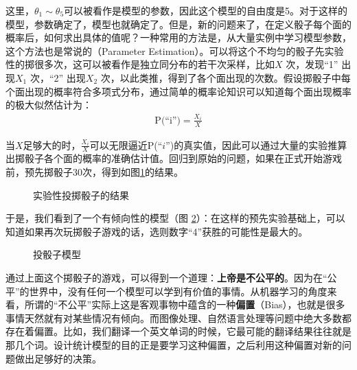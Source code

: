 \noindent 这里，$\theta_1 \sim \theta_5$可以被看作是模型的参数，因此这个模型的自由度是5。对于这样的模型，参数确定了，模型也就确定了。但是，新的问题来了，在定义骰子每个面的概率后，如何求出具体的值呢？一种常用的方法是，从大量实例中学习模型参数，这个方法也是常说的{\small{}}（Parameter Estimation）。可以将这个不均匀的骰子先实验性的掷很多次，这可以被看作是独立同分布的若干次采样，比如$X$ 次，发现``1'' 出现$X_1$ 次，``2'' 出现$X_2$ 次，以此类推，得到了各个面出现的次数。假设掷骰子中每个面出现的概率符合多项式分布，通过简单的概率论知识可以知道每个面出现概率的极大似然估计为：
\begin{eqnarray}
\textrm{P(``i'')}=\frac {X_i}{X}
\label{eq:2-19}
\end{eqnarray}

\parinterval 当$X$足够大的时，$\frac{X_i}{X}$可以无限逼近P(``$i$'')的真实值，因此可以通过大量的实验推算出掷骰子各个面的概率的准确估计值。回归到原始的问题，如果在正式开始游戏前，预先掷骰子30次，得到如图\ref{fig:2-12}的结果。

\begin{figure}[htp]
\centering

\caption{实验性投掷骰子的结果}
\label{fig:2-12}
\end{figure}

\parinterval 于是，我们看到了一个有倾向性的模型（图 \ref{fig:2-13}）：在这样的预先实验基础上，可以知道如果再次玩掷骰子游戏的话，选则数字``4''获胜的可能性是最大的。

\begin{figure}[htp]
\centering

\caption{投骰子模型}
\label{fig:2-13}
\end{figure}

\parinterval 通过上面这个掷骰子的游戏，可以得到一个道理：{\small\sffamily\bfseries{上帝是不公平的}}。因为在``公平''的世界中，没有任何一个模型可以学到有价值的事情。从机器学习的角度来看，所谓的``不公平''实际上这是客观事物中蕴含的一种{\small\sffamily\bfseries{偏置}}（Bias），也就是很多事情天然就有对某些情况有倾向。而图像处理、自然语言处理等问题中绝大多数都存在着偏置。比如，我们翻译一个英文单词的时候，它最可能的翻译结果往往就是那几个词。设计统计模型的目的正是要学习这种偏置，之后利用这种偏置对新的问题做出足够好的决策。


